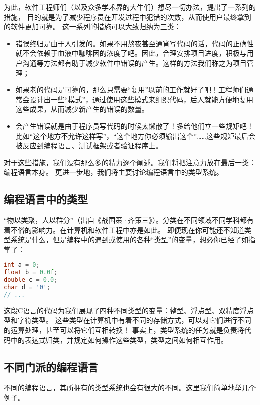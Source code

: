 \documentclass[../main.tex]{subfiles}
\begin{document}
  \indent 为此，软件工程师们（以及众多学术界的大牛们）想尽一切办法，提出了一系列的措施，
  目的就是为了减少程序员在开发过程中犯错的次数，从而使用户最终拿到的软件更加可靠。
  这一系列的措施可以大致归纳为三类：\cite{sf}
  \begin{itemize}
    \item 错误终归是由于人引发的。如果不用熬夜甚至通宵写代码的话，代码的正确性就不会依赖于血液中咖啡因的浓度了吧。因此，合理安排项目进度，积极与用户沟通等方法都有助于减少软件中错误的产生。这样的方法我们称之为项目管理；
    \item 如果老的代码是可靠的，那么只需要“复用”以前的工作就好了吧！工程师们通常会设计出一些“模式”，通过使用这些模式来组织代码，后人就能方便地复用这些成果，从而减少新产生的错误的数量。
    \item 会产生错误就是由于程序员写代码的时候太懒散了！多给他们立一些规矩吧！比如“这个地方不允许这样写”，“这个地方你必须输出这个”……这些规矩最后会被反应到编程语言、测试框架或者验证程序上。
  \end{itemize}

  \indent 对于这些措施，我们没有那么多的精力逐个阐述。我们将把注意力放在最后一类：编程语言本身。
  更进一步地，我们将主要讨论编程语言中的类型系统。

  \subsection{编程语言中的类型}
  \indent “物以类聚，人以群分”（出自《战国策·齐策三》）。分类在不同领域不同学科都有着不俗的影响力。在计算机和软件工程中亦是如此。
  即便现在你可能还不知道类型系统是什么，但是编程中的遇到或使用的各种“类型”的变量，想必你已经了如指掌了：
  
\begin{lstlisting}[language=c]
int a = 0;
float b = 0.0f;
double c = 0.0;
char d = '0';
// ...
\end{lstlisting}

  \indent 这段C语言的代码为我们展现了四种不同类型的变量：整型、浮点型、双精度浮点型和字符类型。
  这些类型在计算机中有着不同的存储方式，可以对它们进行不同的运算处理，甚至可以将它们互相转换！
  事实上，类型系统的任务就是负责将代码中的表达式归类，并规定如何操作这些类型，类型之间如何相互作用。\cite{typewiki}

  \subsection{不同门派的编程语言}
  \indent 不同的编程语言，其所拥有的类型系统也会有很大的不同。这里我们简单地举几个例子。
\end{document}

